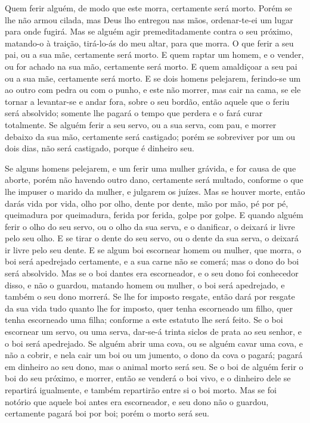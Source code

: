 Quem ferir alguém, de modo que este morra, certamente será morto.
Porém se lhe não armou cilada, mas Deus lho entregou nas
mãos, ordenar-te-ei um lugar para onde fugirá. Mas se alguém
agir premeditadamente contra o seu próximo, matando-o à traição,
tirá-lo-ás do meu altar, para que morra. O que ferir a seu
pai, ou a sua mãe, certamente será morto. E quem raptar um
homem, e o vender, ou for achado na sua mão, certamente será morto.
E quem amaldiçoar a seu pai ou a sua mãe, certamente será
morto. E se dois homens pelejarem, ferindo-se um ao outro com
pedra ou com o punho, e este não morrer, mas cair na cama, se
ele tornar a levantar-se e andar fora, sobre o seu bordão, então
aquele que o feriu será absolvido; somente lhe pagará o tempo que
perdera e o fará curar totalmente. Se alguém ferir a seu
servo, ou a sua serva, com pau, e morrer debaixo da sua mão,
certamente será castigado; porém se sobreviver por um ou dois
dias, não será castigado, porque é dinheiro seu.

Se alguns homens pelejarem, e um ferir uma mulher grávida, e for
causa de que aborte, porém não havendo outro dano, certamente será
multado, conforme o que lhe impuser o marido da mulher, e julgarem
os juízes. Mas se houver morte, então darás vida por vida,
olho por olho, dente por dente, mão por mão, pé por pé,
queimadura por queimadura, ferida por ferida, golpe por
golpe. E quando alguém ferir o olho do seu servo, ou o olho
da sua serva, e o danificar, o deixará ir livre pelo seu olho.
E se tirar o dente do seu servo, ou o dente da sua serva, o
deixará ir livre pelo seu dente. E se algum boi escornear
homem ou mulher, que morra, o boi será apedrejado certamente, e a
sua carne não se comerá; mas o dono do boi será absolvido.
Mas se o boi dantes era escorneador, e o seu dono foi
conhecedor disso, e não o guardou, matando homem ou mulher, o boi
será apedrejado, e também o seu dono morrerá. Se lhe for
imposto resgate, então dará por resgate da sua vida tudo quanto lhe
for imposto, quer tenha escorneado um filho, quer tenha
escorneado uma filha; conforme a este estatuto lhe será feito.
Se o boi escornear um servo, ou uma serva, dar-se-á trinta
siclos de prata ao seu senhor, e o boi será apedrejado. Se
alguém abrir uma cova, ou se alguém cavar uma cova, e não a cobrir,
e nela cair um boi ou um jumento, o dono da cova o pagará;
pagará em dinheiro ao seu dono, mas o animal morto será seu.
Se o boi de alguém ferir o boi do seu próximo, e morrer,
então se venderá o boi vivo, e o dinheiro dele se repartirá
igualmente, e também repartirão entre si o boi morto. Mas se
foi notório que aquele boi antes era escorneador, e seu dono não o
guardou, certamente pagará boi por boi; porém o morto será seu.

